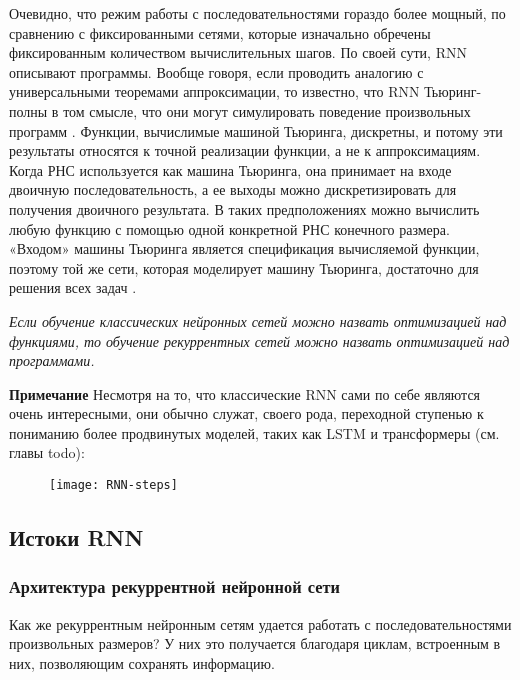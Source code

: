 Очевидно, что режим работы с последовательностями гораздо более мощный, по сравнению 
с фиксированными сетями, которые изначально обречены фиксированным количеством 
вычислительных шагов. По своей сути, RNN описывают программы. Вообще говоря, 
если проводить аналогию с универсальными теоремами аппроксимации, то известно, что 
RNN Тьюринг-полны в том смысле, что они могут симулировать поведение произвольных 
программ \cite{karpathy}. Функции, вычислимые машиной Тьюринга, дискретны, и потому 
эти результаты относятся к точной реализации функции, а не к аппроксимациям. 
Когда РНС используется как машина Тьюринга, она принимает на входе двоичную 
последовательность, а ее выходы можно дискретизировать для получения двоичного результата. В таких
предположениях можно вычислить любую функцию с помощью одной конкретной
РНС конечного размера. «Входом» машины Тьюринга является спецификация вычисляемой
функции, поэтому той же сети, которая моделирует машину Тьюринга, достаточно
для решения всех задач \cite{Goodfellow-et-al-2016}.
\begin{center}
    \textit{Если обучение классических нейронных сетей можно назвать оптимизацией над 
    функциями, то обучение рекуррентных сетей можно назвать оптимизацией над программами.}
\end{center}

\noindent\textbf{Примечание} \hspace{10pt} Несмотря на то, что классические RNN сами по себе являются очень интересными, 
они обычно служат, своего рода, переходной ступенью к пониманию более 
продвинутых моделей, таких как LSTM и трансформеры (см. главы {\color{red} todo}):

\begin{figure}[h!]
    \centering
    \texttt{[image: RNN-steps]}
    \caption{}
    \label{fig:RNN-steps}
\end{figure}

\newpage

\subsection{Истоки RNN}

\subsubsection{Архитектура рекуррентной нейронной сети}

Как же рекуррентным нейронным сетям удается работать с последовательностями 
произвольных размеров? У них это получается благодаря циклам, встроенным 
в них, позволяющим сохранять информацию.

